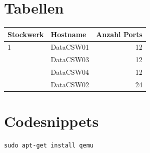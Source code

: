 \documentclass[a4,12pt]{scrartcl}
\begin{document}
\section{Tabellen}
\begin{center}
    \begin{tabular}{@{} l l r@{}}\toprule    
    {Stockwerk} & {Hostname} & {Anzahl Ports}\\ \midrule
    1 & DataCSW01 & 12\\ \addlinespace
    & DataCSW03 & 12\\ \addlinespace
    & DataCSW04 & 12\\ \addlinespace
    2& DataCSW02 & 24\\
    \bottomrule
    \end{tabular}
\end{center}

\section{Codesnippets}
\begin{lstlisting}
sudo apt-get install qemu
\end{lstlisting}
\end{document}
